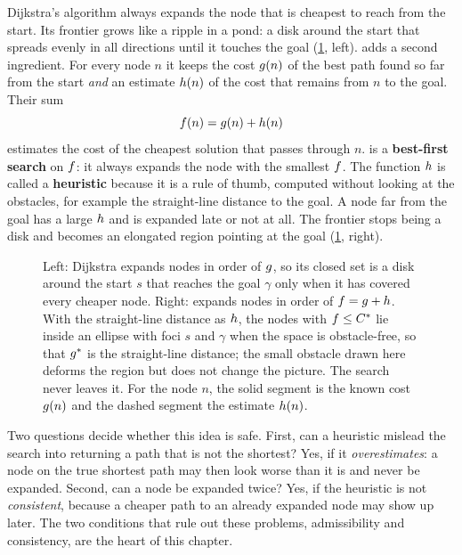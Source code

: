 Dijkstra's algorithm always expands the node that is cheapest to reach from the
start. Its frontier grows like a ripple in a pond: a disk around the start that
spreads evenly in all directions until it touches the goal
(\cref{fig:ch04-idea}, left). \astar adds a second ingredient. For every node
$n$ it keeps the cost $g(n)$ of the best path found so far from the start
\emph{and} an estimate $h(n)$ of the cost that remains from $n$ to the goal.
Their sum
\begin{equation}
  f(n) = g(n) + h(n)
  \label{eq:ch04-f}
\end{equation}
estimates the cost of the cheapest solution that passes through $n$. \astar is a
\textbf{best-first search} on $f$: it always
expands the node with the smallest $f$. The function
$h$ is called a \textbf{heuristic} because it is a rule of
thumb, computed without looking at the obstacles, for example the straight-line
distance to the goal. A node far from the goal has a large $h$ and is
expanded late or not at all. The frontier stops being a disk and becomes an
elongated region pointing at the goal (\cref{fig:ch04-idea}, right).

\begin{figure}[tb]
  \centering
  \caption{Left: Dijkstra expands nodes in order of $g$, so its closed set
  is a disk around the start $s$ that reaches the goal $\gamma$ only when it has
  covered every cheaper node. Right: \astar expands nodes in order of
  $f = g + h$. With the straight-line distance as $h$, the
  nodes with $f \le C^*$ lie inside an ellipse with foci $s$ and $\gamma$
  when the space is obstacle-free, so that $g^*$ is the straight-line
  distance; the small obstacle drawn here deforms the region but does not
  change the picture. The search never leaves it. For the node $n$, the solid segment is the known
  cost $g(n)$ and the dashed segment the estimate $h(n)$.}
  \label{fig:ch04-idea}
\end{figure}

Two questions decide whether this idea is safe. First, can a heuristic mislead
the search into returning a path that is not the shortest? Yes, if it
\emph{overestimates}: a node on the true shortest path may then look worse than
it is and never be expanded. Second, can a node be expanded twice? Yes, if the
heuristic is not \emph{consistent}, because a cheaper path to an already
expanded node may show up later. The two conditions that rule out these
problems, admissibility and consistency, are the heart of this chapter.

